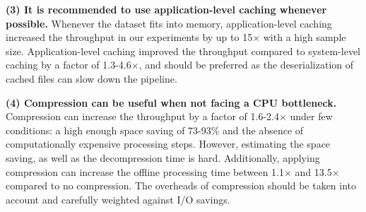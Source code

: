{\color{diff2} 
\textbf{(3) It is recommended to use application-level caching whenever possible. }
Whenever the dataset fits into memory, application-level caching increased the throughput in our experiments by up to 15$\times$ with a high sample size.
Application-level caching improved the throughput compared to system-level caching by a factor of 1.3-4.6$\times$, and should be preferred as the deserialization of cached files can slow down the pipeline.
}

{\color{diff2} 
\textbf{(4) Compression can be useful when not facing a CPU bottleneck. }
Compression can increase the throughput by a factor of 1.6-2.4$\times$ under few conditions: a high enough space saving of 73-93\% and the absence of computationally expensive processing steps.
However, estimating the space saving, as well as the decompression time is hard.
Additionally, applying compression can increase the offline processing time between 1.1$\times$ and 13.5$\times$ compared to no compression.
The overheads of compression should be taken into account and carefully weighted against I/O savings.
}







